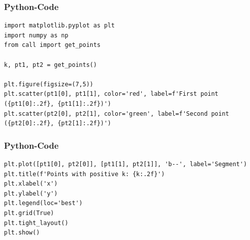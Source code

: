 \documentclass{beamer}
\begin{document}
\begin{frame}[fragile]
\frametitle{Python-Code}
\begin{lstlisting}
import matplotlib.pyplot as plt
import numpy as np
from call import get_points

k, pt1, pt2 = get_points()

plt.figure(figsize=(7,5))
plt.scatter(pt1[0], pt1[1], color='red', label=f'First point ({pt1[0]:.2f}, {pt1[1]:.2f})')
plt.scatter(pt2[0], pt2[1], color='green', label=f'Second point ({pt2[0]:.2f}, {pt2[1]:.2f})')

\end{lstlisting}
\end{frame}

\begin{frame}[fragile]
\frametitle{Python-Code}
\begin{lstlisting}
plt.plot([pt1[0], pt2[0]], [pt1[1], pt2[1]], 'b--', label='Segment')
plt.title(f'Points with positive k: {k:.2f}')
plt.xlabel('x')
plt.ylabel('y')
plt.legend(loc='best')
plt.grid(True)
plt.tight_layout()
plt.show()


\end{lstlisting}
\end{frame}
\end{document}
